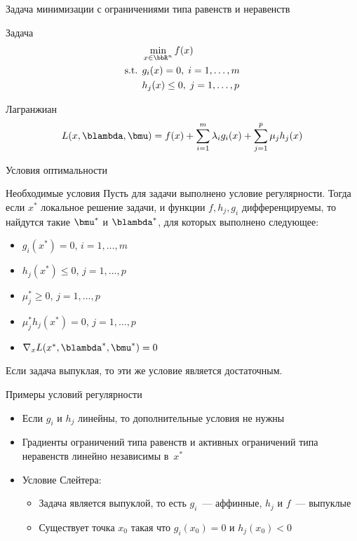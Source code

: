 \documentclass[12pt]{beamer}
\begin{document}
\begin{frame}{{\small Задача минимизации с ограничениями типа равенств и неравенств}}

\begin{block}{Задача}
\vspace{-5mm}
\begin{equation*}
\begin{split}
& \min\limits_{x \in \bbR^n} f(x)\\
\text{s.t. } & g_i(x) = 0, \; i = 1,\ldots,m\\
& h_j(x) \leq 0, \; j = 1,\ldots, p
\end{split}
\end{equation*}
\end{block}

\begin{block}{Лагранжиан}
\begin{equation*}
L(x, \blambda, \bmu) = f(x) + \sum\limits_{i=1}^m\lambda_i g_i(x) + \sum\limits_{j=1}^p \mu_j h_j(x)
\end{equation*}
\end{block}
\end{frame}

\begin{frame}{Условия оптимальности}
\begin{block}{Необходимые условия}
Пусть для задачи выполнено условие регулярности. Тогда если $x^*$ локальное решение задачи, и функции $f, h_j, g_i$ дифференцируемы, то найдутся такие $\bmu^*$ и $\blambda^*$, для которых выполнено следующее:
\begin{itemize}
\item $g_i(x^*) = 0$, $i = 1,\ldots,m$
\item $h_j(x^*) \leq 0$, $j = 1,\ldots,p$
\item $ \mu^*_j \geq 0$, $j = 1,\ldots,p$
\item $\mu^*_jh_j(x^*) = 0$, $j = 1,\ldots,p$
\item $\nabla_x L(x^*, \blambda^*, \bmu^*) = 0$
\end{itemize}
\end{block}
Если задача выпуклая, то эти же условие является достаточным.
\end{frame}

\begin{frame}{Примеры условий регулярности}
\begin{itemize}
\item Если $g_i$ и $h_j$ линейны, то дополнительные условия не нужны
\item Градиенты ограничений типа равенств и активных ограничений типа неравенств линейно независимы в~$x^*$
\item Условие Слейтера:
\begin{itemize}
\item Задача является выпуклой, то есть $g_i$~--- аффинные, $h_j$ и $f$~--- выпуклые
\item Существует точка $x_0$ такая что $g_i(x_0) = 0$ и $h_j(x_0) < 0$
\end{itemize}

\end{itemize}
\end{frame}
\end{document}
